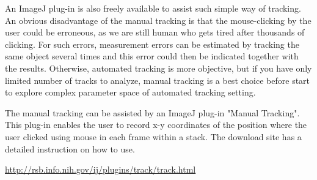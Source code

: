 An ImageJ plug-in is also freely available to assist such simple way of
tracking. An obvious disadvantage of the manual tracking is that the
mouse-clicking by the user could be erroneous, as we are still human
who gets tired after thousands of clicking. For such errors,
measurement errors can be estimated by tracking the same object several
times and this error could then be indicated together with the results.
Otherwise, automated tracking is more objective, but if you have only
limited number of tracks to analyze, manual tracking is a best choice
before start to explore complex parameter space of automated tracking
setting.

The manual tracking can be assisted by an ImageJ plug-in
"Manual Tracking". This plug-in
enables the user to record x-y coordinates of the position where the
user clicked using mouse in each frame within a stack. The download
site has a detailed instruction on how to use.  


\url{http://rsb.info.nih.gov/ij/plugins/track/track.html}


